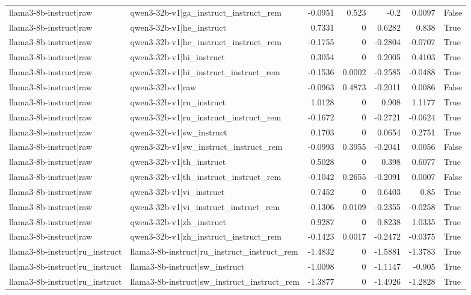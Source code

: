 \begin{table}
\begin{tabular}{l l r r r r l}
llama3-8b-instruct|raw & qwen3-32b-v1|ga_instruct_instruct_rem & -0.0951 & 0.523 & -0.2 & 0.0097 & False \\
llama3-8b-instruct|raw & qwen3-32b-v1|he_instruct & 0.7331 & 0 & 0.6282 & 0.838 & True \\
llama3-8b-instruct|raw & qwen3-32b-v1|he_instruct_instruct_rem & -0.1755 & 0 & -0.2804 & -0.0707 & True \\
llama3-8b-instruct|raw & qwen3-32b-v1|hi_instruct & 0.3054 & 0 & 0.2005 & 0.4103 & True \\
llama3-8b-instruct|raw & qwen3-32b-v1|hi_instruct_instruct_rem & -0.1536 & 0.0002 & -0.2585 & -0.0488 & True \\
llama3-8b-instruct|raw & qwen3-32b-v1|raw & -0.0963 & 0.4873 & -0.2011 & 0.0086 & False \\
llama3-8b-instruct|raw & qwen3-32b-v1|ru_instruct & 1.0128 & 0 & 0.908 & 1.1177 & True \\
llama3-8b-instruct|raw & qwen3-32b-v1|ru_instruct_instruct_rem & -0.1672 & 0 & -0.2721 & -0.0624 & True \\
llama3-8b-instruct|raw & qwen3-32b-v1|sw_instruct & 0.1703 & 0 & 0.0654 & 0.2751 & True \\
llama3-8b-instruct|raw & qwen3-32b-v1|sw_instruct_instruct_rem & -0.0993 & 0.3955 & -0.2041 & 0.0056 & False \\
llama3-8b-instruct|raw & qwen3-32b-v1|th_instruct & 0.5028 & 0 & 0.398 & 0.6077 & True \\
llama3-8b-instruct|raw & qwen3-32b-v1|th_instruct_instruct_rem & -0.1042 & 0.2655 & -0.2091 & 0.0007 & False \\
llama3-8b-instruct|raw & qwen3-32b-v1|vi_instruct & 0.7452 & 0 & 0.6403 & 0.85 & True \\
llama3-8b-instruct|raw & qwen3-32b-v1|vi_instruct_instruct_rem & -0.1306 & 0.0109 & -0.2355 & -0.0258 & True \\
llama3-8b-instruct|raw & qwen3-32b-v1|zh_instruct & 0.9287 & 0 & 0.8238 & 1.0335 & True \\
llama3-8b-instruct|raw & qwen3-32b-v1|zh_instruct_instruct_rem & -0.1423 & 0.0017 & -0.2472 & -0.0375 & True \\
llama3-8b-instruct|ru_instruct & llama3-8b-instruct|ru_instruct_instruct_rem & -1.4832 & 0 & -1.5881 & -1.3783 & True \\
llama3-8b-instruct|ru_instruct & llama3-8b-instruct|sw_instruct & -1.0098 & 0 & -1.1147 & -0.905 & True \\
llama3-8b-instruct|ru_instruct & llama3-8b-instruct|sw_instruct_instruct_rem & -1.3877 & 0 & -1.4926 & -1.2828 & True \\

\end{tabular}
\end{table}
